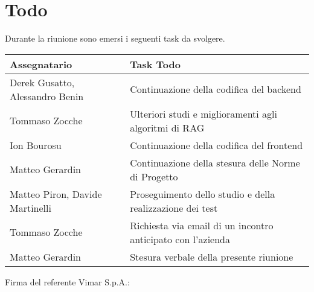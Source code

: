 \section{Todo}
Durante la riunione sono emersi i seguenti task da svolgere.

\begin{center}
    \begin{tabular}{|L{5cm}|L{8cm}|}
        \hline
        \textbf{Assegnatario} & \textbf{Task Todo} \\ \hline
        Derek Gusatto, Alessandro Benin &  Continuazione della codifica del backend \\ \hline
        Tommaso Zocche &  Ulteriori studi e miglioramenti agli algoritmi di RAG \\ \hline
        Ion Bourosu &  Continuazione della codifica del frontend \\ \hline
        Matteo Gerardin &  Continuazione della stesura delle Norme di Progetto \\ \hline
        Matteo Piron, Davide Martinelli &  Proseguimento dello studio e della realizzazione dei test \\ \hline
        Tommaso Zocche & Richiesta via email di un incontro anticipato con l'azienda \\ \hline
        Matteo Gerardin &  Stesura verbale della presente riunione \\ \hline
    \end{tabular}
\end{center}

\vspace{4cm}
\noindent Firma del referente Vimar S.p.A.: \underline{\hspace{5cm}}